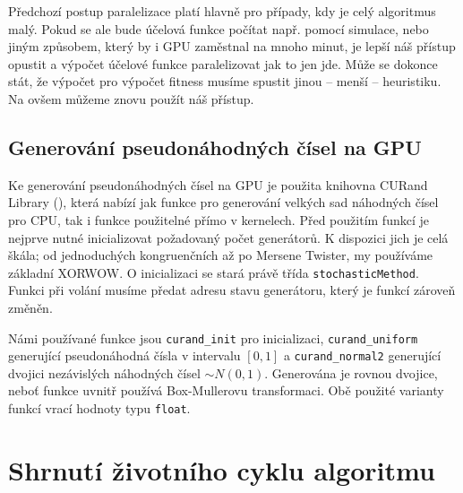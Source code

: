 Předchozí postup paralelizace platí hlavně pro případy, kdy je celý algoritmus \bq malý\eq. Pokud se ale bude účelová funkce počítat např. pomocí simulace, nebo jiným způsobem, který by i GPU zaměstnal na mnoho minut, je lepší náš přístup opustit a výpočet účelové funkce paralelizovat jak to jen jde. Může se dokonce stát, že výpočet pro výpočet fitness musíme spustit jinou -- menší -- heuristiku. Na ovšem můžeme znovu použít náš přístup.

\subsection{Generování pseudonáhodných čísel na GPU}

Ke generování pseudonáhodných čísel na GPU je použita knihovna CURand Library (), která nabízí jak funkce pro generování velkých sad náhodných čísel pro CPU, tak i funkce použitelné přímo v kernelech. Před použitím funkcí je nejprve nutné inicializovat požadovaný počet generátorů. K dispozici jich je celá škála; od jednoduchých kongruenčních až po Mersene Twister, my používáme základní XORWOW. O inicializaci se stará právě třída \texttt{stochasticMethod}. Funkci při volání musíme předat adresu stavu generátoru, který je funkcí zároveň změněn.

Námi používané funkce jsou \texttt{curand\_init} pro inicializaci, \texttt{curand\_uniform} generující pseudonáhodná čísla v intervalu $[0,1]$ a \texttt{curand\_normal2} generující dvojici nezávislých náhodných čísel $\sim N(0,1)$. Generována je rovnou dvojice, neboť funkce uvnitř používá Box-Mullerovu transformaci. Obě použité varianty funkcí vrací hodnoty typu \texttt{float}.

\section{Shrnutí životního cyklu algoritmu}

